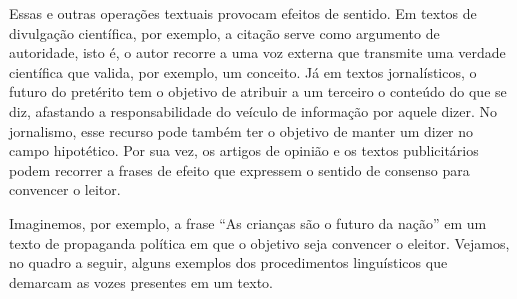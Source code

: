 Essas e outras operações textuais provocam efeitos de sentido. Em textos
de divulgação científica, por exemplo, a citação serve como argumento de
autoridade, isto é, o autor recorre a uma voz externa que transmite uma
verdade científica que valida, por exemplo, um conceito. Já em textos
jornalísticos, o futuro do pretérito tem o objetivo de atribuir a um
terceiro o conteúdo do que se diz, afastando a responsabilidade do
veículo de informação por aquele dizer. No jornalismo, esse recurso pode
também ter o objetivo de manter um dizer no campo hipotético. Por sua
vez, os artigos de opinião e os textos publicitários podem recorrer a
frases de efeito que expressem o sentido de consenso para convencer o
leitor.

Imaginemos, por exemplo, a frase ``As crianças são o futuro da nação''
em um texto de propaganda política em que o objetivo seja convencer o
eleitor. Vejamos, no quadro a seguir, alguns exemplos dos procedimentos
linguísticos que demarcam as vozes presentes em um texto.

